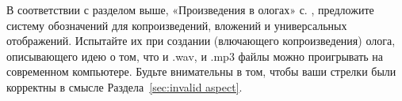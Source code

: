 \documentclass[../main/CT4S-EN-RU]{subfiles}
\begin{document}
\begin{exerciseRUS}
В соответствии с разделом выше, «Произведения в ологах» с. \pageref{sec:ologging products}, предложите систему обозначений для копроизведений, вложений и универсальных отображений. Испытайте их при создании (влючающего копроизведения) олога, описывающего идею о том, что и .wav, и .mp3 файлы можно проигрывать на современном компьютере. Будьте внимательны в том, чтобы ваши стрелки были корректны в смысле Раздела~\ref{sec:invalid aspect}.
\end{exerciseRUS}
\end{document}
